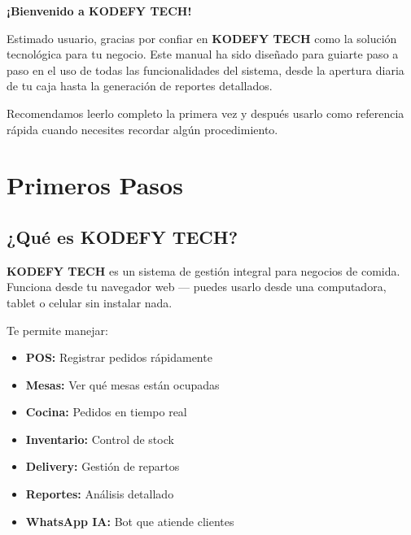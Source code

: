 \documentclass[10pt,a4paper,twoside]{article}
\begin{document}
\newpage
\tableofcontents
\vspace{1cm}
\begin{center}
{\LARGE\bfseries\textcolor{kodefyDark}{¡Bienvenido a KODEFY TECH!}}
\end{center}
\vspace{0.5cm}
Estimado usuario, gracias por confiar en \textbf{KODEFY TECH} como la solución tecnológica para tu negocio. Este manual ha sido diseñado para guiarte paso a paso en el uso de todas las funcionalidades del sistema, desde la apertura diaria de tu caja hasta la generación de reportes detallados.

\begin{tipbox}
Recomendamos leerlo completo la primera vez y después usarlo como referencia rápida cuando necesites recordar algún procedimiento.
\end{tipbox}

\newpage
\twocolumn

\section{Primeros Pasos}

\subsection{¿Qué es KODEFY TECH?}

\textbf{KODEFY TECH} es un sistema de gestión integral para negocios de comida. Funciona desde tu navegador web --- puedes usarlo desde una computadora, tablet o celular sin instalar nada.

Te permite manejar:
\begin{itemize}[itemsep=1pt, leftmargin=15pt]
    \item \textbf{POS:} Registrar pedidos rápidamente
    \item \textbf{Mesas:} Ver qué mesas están ocupadas
    \item \textbf{Cocina:} Pedidos en tiempo real
    \item \textbf{Inventario:} Control de stock
    \item \textbf{Delivery:} Gestión de repartos
    \item \textbf{Reportes:} Análisis detallado
    \item \textbf{WhatsApp IA:} Bot que atiende clientes
\end{itemize}
\end{document}

